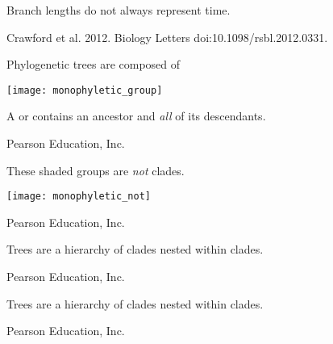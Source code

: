 \documentclass[t]{beamer}
\begin{document}
%
{
\begin{frame}[b]{Branch lengths do not always represent time.}

\hfill\tiny Crawford et al. 2012. Biology Letters doi:10.1098/rsbl.2012.0331.
\end{frame}
}
%
%
\begin{frame}[t]{Phylogenetic trees are composed of }

\begin{multicols}{2}

	\texttt{[image: monophyletic\_group]}

\columnbreak

	\hangpara A  or  contains an ancestor and \emph{all} of its descendants.

\end{multicols}

	\vfilll

\tiny \textcopyright Pearson Education, Inc.
\end{frame}
%
\begin{frame}[t]{These shaded groups are \emph{not} clades.}

	\texttt{[image: monophyletic\_not]}

	\vfilll

\tiny \textcopyright Pearson Education, Inc.
\end{frame}
%
{
\begin{frame}[b]{Trees are a hierarchy of clades nested within clades.}

\tiny \textcopyright Pearson Education, Inc.
\end{frame}
}
{
\begin{frame}[b]{Trees are a hierarchy of clades nested within clades.}

\tiny \textcopyright Pearson Education, Inc.
\end{frame}
}
\end{document}
